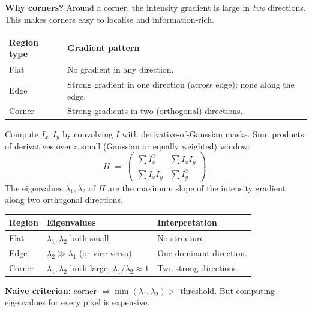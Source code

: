 \textbf{Why corners?} Around a corner, the intensity gradient is large in \emph{two} directions. This makes corners easy to localise and information-rich.

\begin{center}
\renewcommand{\arraystretch}{1.3}
\begin{tabular}{@{} l p{8.5cm} @{}}
\toprule
\textbf{Region type} & \textbf{Gradient pattern} \\
\midrule
Flat & No gradient in any direction. \\
Edge & Strong gradient in one direction (across edge); none along the edge. \\
Corner & Strong gradients in two (orthogonal) directions. \\
\bottomrule
\end{tabular}
\end{center}

\separator

\begin{defbox}
Compute $I_x, I_y$ by convolving $I$ with derivative-of-Gaussian masks. Sum products of derivatives over a small (Gaussian or equally weighted) window:
\[
H \;=\; \begin{pmatrix} \sum I_x^2 & \sum I_x I_y \\ \sum I_x I_y & \sum I_y^2 \end{pmatrix}.
\]
The eigenvalues $\lambda_1, \lambda_2$ of $H$ are the maximum slope of the intensity gradient along two orthogonal directions.
\end{defbox}

\begin{center}
\renewcommand{\arraystretch}{1.3}
\begin{tabular}{@{} l l p{6cm} @{}}
\toprule
\textbf{Region} & \textbf{Eigenvalues} & \textbf{Interpretation} \\
\midrule
Flat & $\lambda_1, \lambda_2$ both small & No structure. \\
Edge & $\lambda_2 \gg \lambda_1$ (or vice versa) & One dominant direction. \\
Corner & $\lambda_1, \lambda_2$ both large, $\lambda_1/\lambda_2 \approx 1$ & Two strong directions. \\
\bottomrule
\end{tabular}
\end{center}

\textbf{Naive criterion:} corner $\Leftrightarrow \min(\lambda_1, \lambda_2) > $ threshold. But computing eigenvalues for every pixel is expensive.

